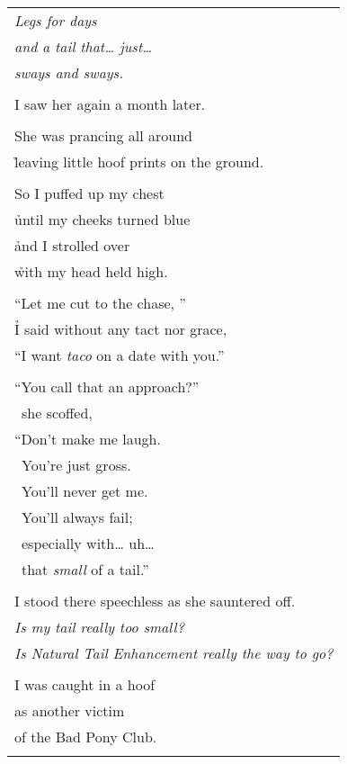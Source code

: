 \documentclass{article}
\begin{document}
\begin{center}
\begin{tabular}{l}
\end{tabular}
\begin{tabular}{l}
\\
\textit{Legs for days} \\
\h\textit{and a tail that\ldots{} just\ldots{}} \\
\h\textit{sways and sways.} \\
\\
I saw her again a month later. \\
\\
She was prancing all around \\
\h leaving little hoof prints on the ground. \\
\\
So I puffed up my chest \\
\h until my cheeks turned blue \\
\h and I strolled over \\
\h with my head held high. \\
\\
``Let me cut to the chase, '' \\
\h I said without any tact nor grace, \\
``I want \textit{taco} on a date with you.'' \\
\\
``You call that an approach?'' \\
\ she scoffed, \\
``Don't make me laugh. \\
\ You're just gross. \\
\ You'll never get me. \\
\ You'll always fail; \\
\ especially with\ldots{} uh\ldots{} \\
\ that \textit{small} of a tail.'' \\
\\
I stood there speechless as she sauntered off. \\
\h\textit{Is my tail really too small?} \\
\h\textit{Is Natural Tail Enhancement really the way to go?} \\
\\
I was caught in a hoof \\
as another victim \\
of the Bad Pony Club. \\
\\
\end{tabular}
\end{center}
\end{document}
